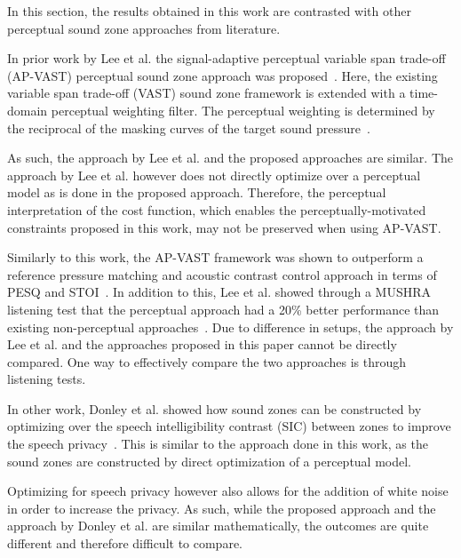 In this section, the results obtained in this work are contrasted with other perceptual sound zone
approaches from literature.

In prior work by Lee et al. the signal-adaptive perceptual variable span trade-off (AP-VAST)
perceptual sound zone approach was proposed~\cite{lee2019towards, lee2020signal}.
Here, the existing variable span trade-off (VAST) sound zone framework is extended with a 
time-domain perceptual weighting filter.
The perceptual weighting is determined by the reciprocal of the masking curves of the 
target sound pressure~\cite{lee2020signal}.

As such, the approach by Lee et al. and the proposed approaches are similar.
The approach by Lee et al. however does not directly optimize over a perceptual model as is done in 
the proposed approach.
Therefore, the perceptual interpretation of the cost function, which enables the perceptually-motivated constraints
proposed in this work, 
may not be preserved when using AP-VAST. 

Similarly to this work, the AP-VAST framework was shown to outperform a reference pressure matching
and acoustic contrast control approach in terms of PESQ and STOI~\cite{lee2019towards}.
In addition to this, Lee et al. showed through a MUSHRA listening test that the perceptual approach had a 20\%
better performance than existing non-perceptual approaches~\cite{lee2020signal}.
Due to difference in setups, the approach by Lee et al. and the approaches proposed in this paper cannot be 
directly compared.
One way to effectively compare the two approaches is through listening tests.

In other work, Donley et al. showed how sound zones can be constructed by optimizing over the speech
intelligibility contrast (SIC) between zones to improve the speech 
privacy~\cite{donley2015multizone, donley2016improving, donley2018multizone}.
This is similar to the approach done in this work, as the sound zones are constructed by direct optimization
of a perceptual model.

Optimizing for speech privacy however also allows for the addition of white noise in order to increase the privacy.
As such, while the proposed approach and the approach by Donley et al. are similar mathematically, the outcomes are quite 
different and therefore difficult to compare.
